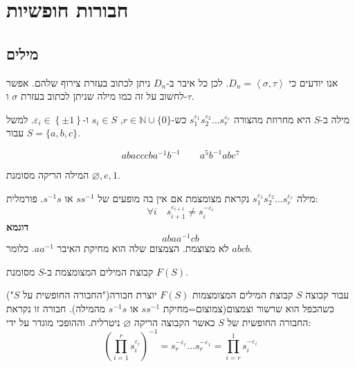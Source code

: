 \documentclass{tstextbook}
\begin{document}
\section{חבורות חופשיות}

\subsection{מילים}

אנו יודעים כי \(D_{n}=\left\langle  \sigma,\tau \right\rangle\). לכן כל איבר ב-\(D_{n}\) ניתן לכתוב בעזרת צירוף שלהם. אפשר לחשוב על זה כמו מילה שניתן לכתוב בעזרת \(\sigma\) ו-\(\tau\).

\begin{definition}
מילה ב-\(S\) היא מחרוזת מהצורה \(s_{1}^{\varepsilon_{1}} s_{2}^{\varepsilon_{2}} \dots s_{r}^{\varepsilon_{r}}\) כש-\(r\in \mathbb{N} \cup \{ 0 \}\), \(s_{i}\in S\) ו-\(\varepsilon_{i}\in \left\{  \pm 1  \right\}\). למשל עבור \(S=\{ a,b,c \}\).

\end{definition}
\begin{example}
$$abacccba^{-1} b^{-1} \qquad a^5b^{-1} abc^7$$

\end{example}
\begin{symbolize}
המילה הריקה מסומנת \(\varnothing,e,1\).

\end{symbolize}
\begin{definition}
מילה \(s_{1}^{\varepsilon_{1}} s_{2}^{\varepsilon_{2}} \dots s_{r}^{\varepsilon_{r}}\) נקראת מצומצמת אם אין בה מופעים של \(ss ^{-1}\) או \(s ^{-1} s\). פורמלית:
$$\forall i\quad s_{i+1}^{\varepsilon_{i+1}}\neq s_{i}^{-\varepsilon_{i}}$$\textbf{דוגמא}$$abaa ^{-1} cb$$
לא מצוצמת. הצמצום שלה הוא מחיקת האיבר \(aa^{-1}\). כלומר \(abcb\).

\end{definition}
\begin{definition}
קבוצת המילים המצומצמת ב-\(S\) מסומנת \(F(S)\). 

\end{definition}
\begin{proposition}
עבור קבוצה \(S\) קבוצת המילים המצומצמות \(F(S)\) יוצרת חבורה("החבורה החופשית על \(S\)") כשהכפל הוא שרשור וצמצום(צמוצום=מחיקת \(ss^{-1}\) או \(s ^{-1} s\) מהמילה). חבורה זו נקראת החבורה החופשית של \(S\) כאשר הקבוצה הריקה \(\varnothing\) ניטרלית. וההופכי מוגדר על ידי:
$$\left( \prod_{i=1}^r s_{i}^{\varepsilon_{i}} \right)^{-1} = s_{r}^{-\varepsilon_{r}}\dots s_{r}^{-\varepsilon _{1}}=\prod_{i=r}^1 s_{i}^{-\varepsilon_{i}}$$

\end{proposition}
\end{document}
